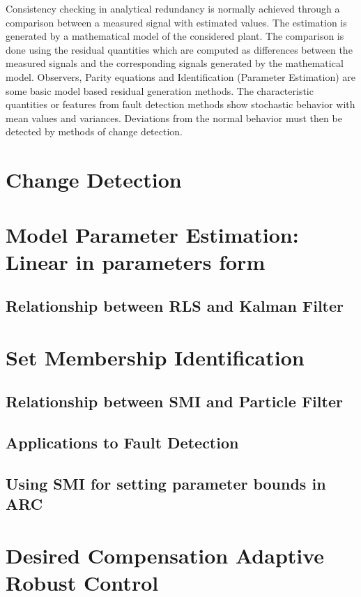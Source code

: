 Consistency checking in analytical redundancy is normally achieved through a comparison between a measured signal with
estimated values. The estimation is generated by a mathematical model of the considered plant. The comparison is done
using the residual quantities which are computed as differences between the measured signals and the corresponding
signals generated by the mathematical model. Observers, Parity equations and Identification (Parameter Estimation) are
some basic model based residual generation methods. The characteristic quantities or features from fault detection
methods show stochastic behavior with mean values and variances. Deviations from the normal behavior must then be
detected by methods of change detection.

\section{Change Detection}
\section{Model Parameter Estimation: Linear in parameters form}
\subsection{Relationship between RLS and Kalman Filter}
\section{Set Membership Identification}
\subsection{Relationship between SMI and Particle Filter}
\subsection{Applications to Fault Detection}
\subsection{Using SMI for setting parameter bounds in ARC}
\section{Desired Compensation Adaptive Robust Control}
